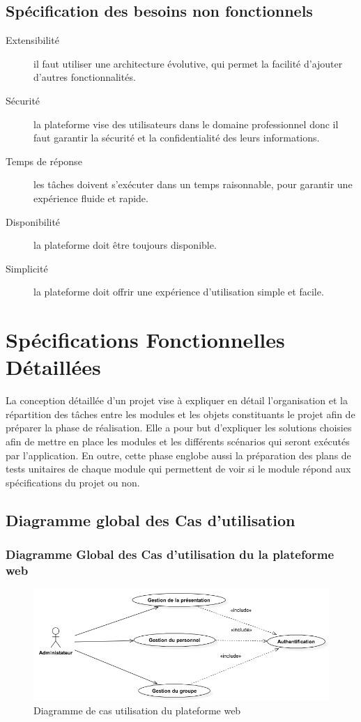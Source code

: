 \documentclass[12pt, ChapStyle1, oneside]{./Styles/Dea_Gsm}
\begin{document}
\subsection{Spécification des besoins non fonctionnels}
\begin{description}
\item [Extensibilité]
il faut utiliser une architecture évolutive, qui permet la facilité d’ajouter d’autres fonctionnalités.
\item [Sécurité]
la plateforme vise des utilisateurs dans le domaine professionnel donc il faut garantir la sécurité et la confidentialité des leurs informations.
\item [Temps de réponse]
les tâches doivent s’exécuter dans un temps raisonnable, pour garantir une expérience fluide et rapide.
\item [Disponibilité]
la plateforme doit être toujours disponible.
\item [Simplicité]
la plateforme doit offrir une expérience d’utilisation simple et facile.
\end{description}
\section{Spécifications Fonctionnelles Détaillées}
La conception détaillée d’un projet vise à expliquer en détail l’organisation et la répartition des tâches entre les modules et les objets constituants le projet afin de préparer la phase de réalisation. Elle a pour but d’expliquer les solutions choisies afin de mettre en place les modules et les différents scénarios qui seront exécutés par l'application. En outre, cette phase englobe aussi la préparation des plans de tests unitaires de chaque module qui permettent de voir si le module répond aux spécifications du projet ou non.
\subsection{Diagramme global des Cas d’utilisation}
\subsubsection{Diagramme Global des Cas d’utilisation du la plateforme web}

\begin{figure}[H]
    \centering
    \includegraphics[width=5.0in]{UseCaseDiagramWeb}
    \caption{Diagramme de cas utilisation du plateforme web}
    \label{UseCaseDiagramWeb}
\end{figure}
\end{document}

